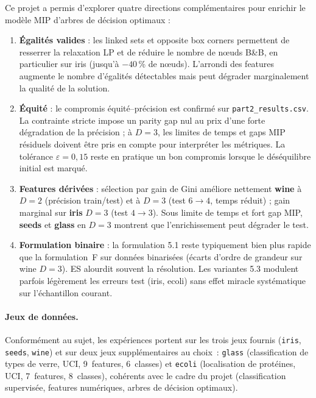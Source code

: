 \documentclass[a4paper,10pt,titlepage,leqno]{article}
\begin{document}
Ce projet a permis d'explorer quatre directions complémentaires pour enrichir le modèle MIP d'arbres de décision optimaux :

\begin{enumerate}
  \item \textbf{Égalités valides} : les linked sets et opposite box corners permettent de resserrer la relaxation LP et de réduire le nombre de nœuds B\&B, en particulier sur iris (jusqu'à $-40$\,\% de nœuds). L'arrondi des features augmente le nombre d'égalités détectables mais peut dégrader marginalement la qualité de la solution.

  \item \textbf{Équité} : le compromis équité--précision est confirmé sur \texttt{part2\_results.csv}. La contrainte stricte impose un parity gap nul au prix d'une forte dégradation de la précision ; à $D{=}3$, les limites de temps et gaps MIP résiduels doivent être pris en compte pour interpréter les métriques. La tolérance $\varepsilon{=}0{,}15$ reste en pratique un bon compromis lorsque le déséquilibre initial est marqué.

  \item \textbf{Features dérivées} : sélection par gain de Gini améliore nettement \textbf{wine} à $D{=}2$ (précision train/test) et à $D{=}3$ (test $6 \to 4$, temps réduit) ; gain marginal sur \textbf{iris} $D{=}3$ (test $4 \to 3$). Sous limite de temps et fort gap MIP, \textbf{seeds} et \textbf{glass} en $D{=}3$ montrent que l'enrichissement peut dégrader le test.

  \item \textbf{Formulation binaire} : la formulation 5.1 reste typiquement bien plus rapide que la formulation~F sur données binarisées (écarts d'ordre de grandeur sur wine $D{=}3$). ES alourdit souvent la résolution. Les variantes 5.3 modulent parfois légèrement les erreurs test (iris, ecoli) sans effet miracle systématique sur l'échantillon courant.
\end{enumerate}

\paragraph{Jeux de données.} Conformément au sujet, les expériences portent sur les trois jeux fournis (\texttt{iris}, \texttt{seeds}, \texttt{wine}) et sur deux jeux supplémentaires au choix~: \texttt{glass} (classification de types de verre, UCI, 9~features, 6~classes) et \texttt{ecoli} (localisation de protéines, UCI, 7~features, 8~classes), cohérents avec le cadre du projet (classification supervisée, features numériques, arbres de décision optimaux).
\end{document}
